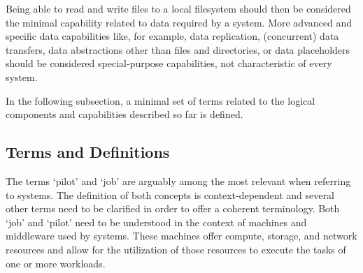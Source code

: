\documentclass{sig-alternate}
\begin{document}

Being able to read and write files to a local filesystem should then be
considered the minimal capability related to data required by a \pilotjob
system. More advanced and specific data capabilities like, for example, data
replication, (concurrent) data transfers, data abstractions other than files and
directories, or data placeholders should be considered special-purpose
capabilities, not characteristic of every \pilotjob system.


In the following subsection, a minimal set of terms related to the logical
components and capabilities described so far is defined.

\subsection{Terms and Definitions}
\label{sec:termsdefs}


The terms `pilot' and `job' are arguably among the most relevant when referring
to \pilotjob systems. The definition of both concepts is context-dependent and
several other terms need to be clarified in order to offer a coherent
terminology. Both `job' and `pilot' need to be understood in the context of
machines and middleware used by \pilotjob systems. These machines offer compute,
storage, and network resources and \pilots allow for the utilization of those
resources to execute the tasks of one or more workloads.
\end{document}
